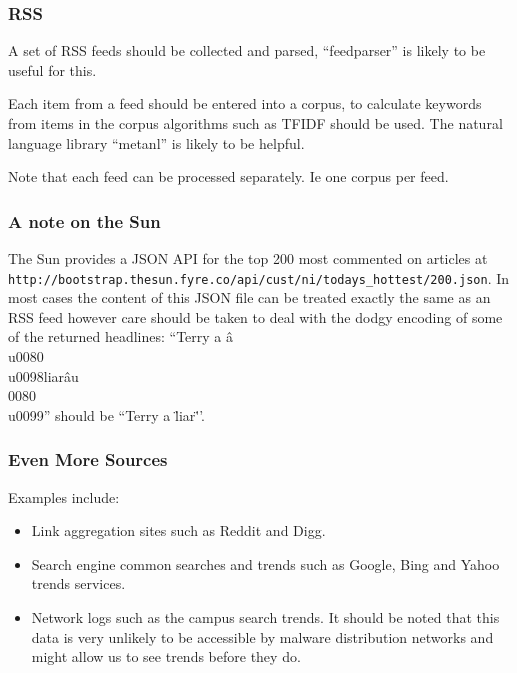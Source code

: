 \subsubsection{RSS}
A set of RSS feeds should be collected and parsed, ``feedparser'' is likely to be useful for this.

Each item from a feed should be entered into a corpus, to calculate keywords from items in the corpus algorithms such as TFIDF should be used. The natural language library ``metanl'' is likely to be helpful.

Note that each feed can be processed separately. Ie one corpus per feed.

\subsubsection{A note on the Sun}
The Sun provides a JSON API for the top 200 most commented on articles at \verb`http://bootstrap.thesun.fyre.co/api/cust/ni/todays_hottest/200.json`. In most cases the content of this JSON file can be treated exactly the same as an RSS feed however care should be taken to deal with the dodgy encoding of some of the returned headlines: ``Terry a â\\u0080\\u0098liarâu\\0080\\u0099'' should be ``Terry a \"liar\"''.

\subsubsection{Even More Sources}
Examples include:
\begin{itemize}
    \item Link aggregation sites such as Reddit and Digg.
    \item Search engine common searches and trends such as Google, Bing and Yahoo trends services.
    \item Network logs such as the campus search trends. It should be noted that this data is very unlikely to be accessible by malware distribution networks and might allow us to see trends before they do.
\end{itemize}

